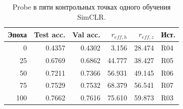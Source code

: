 \begin{table}[H]\centering\small
\setlength{\tabcolsep}{4pt}
\caption{Probe в пяти контрольных точках одного обучения SimCLR.}\label{tab:checkpoints}
\begin{tabular}{rrrrrl}
\toprule
Эпоха & Test acc. & Val acc. & $r_{eff,h}$ & $r_{eff,z}$ & Ист. \\
\midrule
0 & 0.4357 & 0.4302 & 3.156 & 28.474 & R04 \\
25 & 0.6769 & 0.6862 & 44.777 & 38.427 & R05 \\
50 & 0.7211 & 0.7366 & 56.931 & 49.145 & R06 \\
75 & 0.7529 & 0.7532 & 68.379 & 56.541 & R07 \\
100 & 0.7662 & 0.7616 & 75.610 & 59.873 & R03 \\
\bottomrule
\end{tabular}
\end{table}
